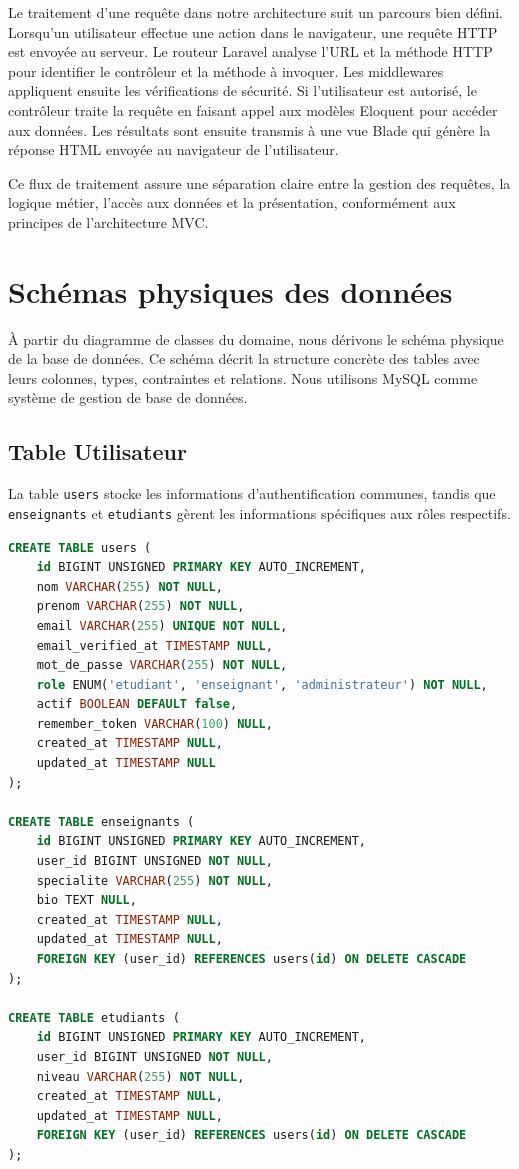 \documentclass[12pt,a4paper]{report}
\begin{document}
Le traitement d'une requête dans notre architecture suit un parcours bien défini. Lorsqu'un utilisateur effectue une action dans le navigateur, une requête HTTP est envoyée au serveur. Le routeur Laravel analyse l'URL et la méthode HTTP pour identifier le contrôleur et la méthode à invoquer. Les middlewares appliquent ensuite les vérifications de sécurité. Si l'utilisateur est autorisé, le contrôleur traite la requête en faisant appel aux modèles Eloquent pour accéder aux données. Les résultats sont ensuite transmis à une vue Blade qui génère la réponse HTML envoyée au navigateur de l'utilisateur.

Ce flux de traitement assure une séparation claire entre la gestion des requêtes, la logique métier, l'accès aux données et la présentation, conformément aux principes de l'architecture MVC.

\section{Schémas physiques des données}
À partir du diagramme de classes du domaine, nous dérivons le schéma physique de la base de données. Ce schéma décrit la structure concrète des tables avec leurs colonnes, types, contraintes et relations. Nous utilisons MySQL comme système de gestion de base de données.

\subsection{Table Utilisateur}
La table \texttt{users} stocke les informations d'authentification communes, tandis que \texttt{enseignants} et \texttt{etudiants} gèrent les informations spécifiques aux rôles respectifs.

\begin{lstlisting}[language=SQL]
CREATE TABLE users (
    id BIGINT UNSIGNED PRIMARY KEY AUTO_INCREMENT,
    nom VARCHAR(255) NOT NULL,
    prenom VARCHAR(255) NOT NULL,
    email VARCHAR(255) UNIQUE NOT NULL,
    email_verified_at TIMESTAMP NULL,
    mot_de_passe VARCHAR(255) NOT NULL,
    role ENUM('etudiant', 'enseignant', 'administrateur') NOT NULL,
    actif BOOLEAN DEFAULT false,
    remember_token VARCHAR(100) NULL,
    created_at TIMESTAMP NULL,
    updated_at TIMESTAMP NULL
);

CREATE TABLE enseignants (
    id BIGINT UNSIGNED PRIMARY KEY AUTO_INCREMENT,
    user_id BIGINT UNSIGNED NOT NULL,
    specialite VARCHAR(255) NOT NULL,
    bio TEXT NULL,
    created_at TIMESTAMP NULL,
    updated_at TIMESTAMP NULL,
    FOREIGN KEY (user_id) REFERENCES users(id) ON DELETE CASCADE
);

CREATE TABLE etudiants (
    id BIGINT UNSIGNED PRIMARY KEY AUTO_INCREMENT,
    user_id BIGINT UNSIGNED NOT NULL,
    niveau VARCHAR(255) NOT NULL,
    created_at TIMESTAMP NULL,
    updated_at TIMESTAMP NULL,
    FOREIGN KEY (user_id) REFERENCES users(id) ON DELETE CASCADE
);
\end{lstlisting}
\end{document}
